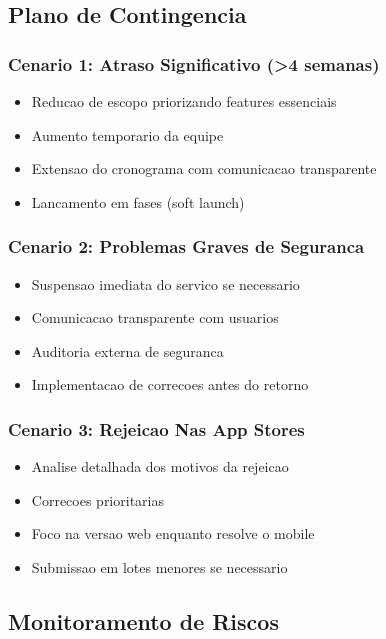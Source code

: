 \subsection{Plano de Contingencia}

\subsubsection{Cenario 1: Atraso Significativo (>4 semanas)}
\begin{itemize}
    \item Reducao de escopo priorizando features essenciais
    \item Aumento temporario da equipe
    \item Extensao do cronograma com comunicacao transparente
    \item Lancamento em fases (soft launch)
\end{itemize}

\subsubsection{Cenario 2: Problemas Graves de Seguranca}
\begin{itemize}
    \item Suspensao imediata do servico se necessario
    \item Comunicacao transparente com usuarios
    \item Auditoria externa de seguranca
    \item Implementacao de correcoes antes do retorno
\end{itemize}

\subsubsection{Cenario 3: Rejeicao Nas App Stores}
\begin{itemize}
    \item Analise detalhada dos motivos da rejeicao
    \item Correcoes prioritarias
    \item Foco na versao web enquanto resolve o mobile
    \item Submissao em lotes menores se necessario
\end{itemize}

\subsection{Monitoramento de Riscos}

